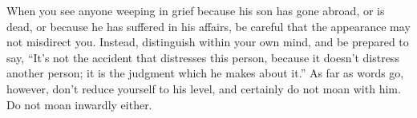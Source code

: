 When you  see anyone weeping in  grief because his  son has gone abroad,  or is
dead, or because he has suffered in his affairs, be careful that the appearance
may  not misdirect  you.  Instead, distinguish  within your  own  mind, and  be
prepared to say,  ``It's not the accident that distresses  this person, because
it doesn't  distress another person;  it is the  judgment which he  makes about
it.'' As  far as  words go, however,  don't reduce yourself  to his  level, and
certainly do not moan with him. Do not moan inwardly either.
